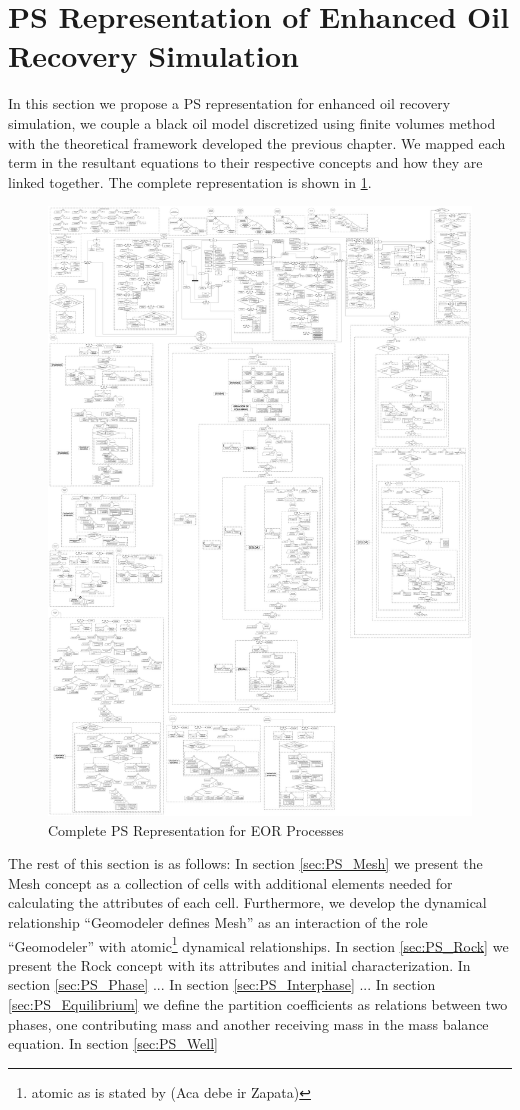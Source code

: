 \section{PS Representation of Enhanced Oil Recovery Simulation}\label{sec:PS_EOR}
In this section we propose a PS representation for enhanced oil recovery simulation, we couple a black oil model discretized using finite volumes method with the theoretical framework developed the previous chapter. We mapped each term in the resultant equations to their respective concepts and how they are linked together. The complete representation is shown in \ref{fig:PSComplete}.\\
\begin{figure}[h]
\centering%
\includegraphics[width=0.9\linewidth]{Kap4/MultifasicoSinPozos.pdf}%
\caption{Complete PS Representation for EOR Processes} \label{fig:PSComplete}
\end{figure}

The rest of this section is as follows: In section \ref{sec:PS_Mesh} we present the Mesh concept as a collection of cells with additional elements needed for calculating the attributes of each cell. Furthermore, we develop the dynamical relationship ``Geomodeler defines Mesh'' as an interaction of the role ``Geomodeler'' with atomic\footnote{atomic as is stated by \cite{AG01} (Aca debe ir Zapata)} dynamical relationships. In section \ref{sec:PS_Rock} we present the Rock concept with its attributes and initial characterization. In section \ref{sec:PS_Phase} ... In section \ref{sec:PS_Interphase} ... In section \ref{sec:PS_Equilibrium} we define the partition coefficients as relations between two phases, one contributing mass and another receiving mass in the mass balance equation. In section \ref{sec:PS_Well}  

